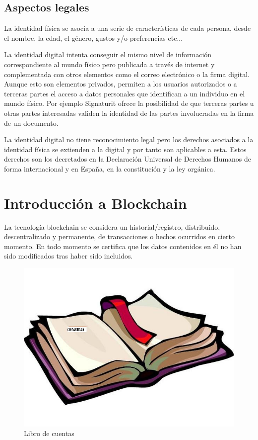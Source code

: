 \documentclass[12pt]{report}
\begin{document}
\subsection{Aspectos legales}

La identidad física se asocia a una serie de características de cada persona, desde el nombre, la edad, el género, gustos y/o preferencias etc...

La identidad digital intenta conseguir el mismo nivel de información correspondiente al mundo físico pero publicada a través de internet y complementada con otros elementos como el correo electrónico o la firma digital. Aunque esto son elementos privados, permiten a los usuarios autorizados o a terceras partes el acceso a datos personales que identifican a un individuo en el mundo físico. 
Por ejemplo Signaturit ofrece la posibilidad de que terceras partes u otras partes interesadas validen la identidad de las partes involucradas en la firma de un documento.

La identidad digital no tiene reconocimiento legal pero los derechos asociados a la identidad física se extienden a la digital y por tanto son aplicables a esta. Estos derechos son los decretados en la Declaración Universal de Derechos Humanos de forma internacional y en España, en la constitución y la ley orgánica.






\section{Introducción a Blockchain}

La tecnología blockchain se considera un historial/registro, distribuido, descentralizado y permanente, de transacciones o hechos ocurridos en cierto momento.
En todo momento se certifica que los datos contenidos en él no han sido modificados tras haber sido incluidos.
\begin{figure}[h]
\includegraphics[scale=0.3]{ledger}
\caption{Libro de cuentas}
\end{figure}
\end{document}
